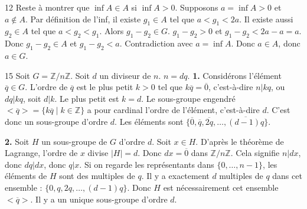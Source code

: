 \begin{correction}{12}
Reste à montrer que $\inf A \in A$ si $\inf A > 0$.
Supposons $a = \inf A > 0$ et $a \notin A$.
Par définition de l'inf, il existe $g_1 \in A$ tel que $a < g_1 < 2a$.
Il existe aussi $g_2 \in A$ tel que $a < g_2 < g_1$.
Alors $g_1 - g_2 \in G$.
$g_1 - g_2 > 0$ et $g_1 - g_2 < 2a - a = a$.
Donc $g_1 - g_2 \in A$ et $g_1 - g_2 < a$.
Contradiction avec $a = \inf A$.
Donc $a \in A$, donc $a \in G$.
\end{correction}

\begin{correction}{15}
Soit $G = \mathbb{Z}/n\mathbb{Z}$. Soit $d$ un diviseur de $n$. $n=dq$.
\textbf{1.} Considérons l'élément $\overline{q} \in G$.
L'ordre de $\overline{q}$ est le plus petit $k > 0$ tel que $k\overline{q} = \overline{0}$, c'est-à-dire $n | kq$, ou $dq | kq$, soit $d | k$.
Le plus petit est $k=d$.
Le sous-groupe engendré $<\overline{q}> = \{ k\overline{q} \mid k \in \mathbb{Z} \}$ a pour cardinal l'ordre de l'élément, c'est-à-dire $d$.
C'est donc un sous-groupe d'ordre $d$.
Les éléments sont $\{\overline{0}, \overline{q}, \overline{2q}, \dots, \overline{(d-1)q}\}$.

\textbf{2.} Soit $H$ un sous-groupe de $G$ d'ordre $d$.
Soit $x \in H$. D'après le théorème de Lagrange, l'ordre de $x$ divise $|H|=d$.
Donc $d x = \overline{0}$ dans $\mathbb{Z}/n\mathbb{Z}$.
Cela signifie $n | dx$, donc $dq | dx$, donc $q | x$.
Si on regarde les représentants dans $\{0, \dots, n-1\}$, les éléments de $H$ sont des multiples de $q$.
Il y a exactement $d$ multiples de $q$ dans cet ensemble : $\{0, q, 2q, \dots, (d-1)q\}$.
Donc $H$ est nécessairement cet ensemble $<\overline{q}>$.
Il y a un unique sous-groupe d'ordre $d$.
\end{correction}